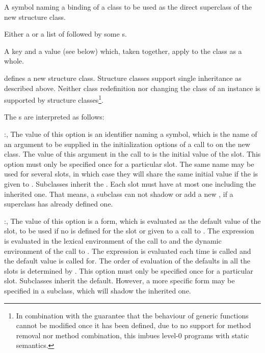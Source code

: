 \begin{optDefinition}
\begin{arguments}
    \item[\scref{superclass-name}] A symbol naming a binding of a class to be
    used as the direct superclass of the new structure class.

    \item[\scref{slot}] Either a  or a list of
     followed by some s.

    \item[\scref{class-option}] A key and a value (see below) which, taken
    together, apply to the class as a whole.
\end{arguments}
%
\remarks%
 defines a new structure class. Structure classes support
single inheritance as described above. Neither class redefinition nor changing
the class of an instance is supported by structure classes\footnote{In
    combination with the guarantee that the behaviour of generic functions
    cannot be modified once it has been defined, due to no support for method
    removal nor method combination, this imbues level-0 programs with static
    semantics.}.

The s are interpreted as follows:
\begin{options}
    \item[\keyworddef{keyword}:, \scref{identifier}]%
    The value of this option is an identifier naming a symbol, which is the name
    of an argument to be supplied in the initialization options of a call to
     on the new class.  The value of this argument in the call
    to  is the initial value of the slot.  This option must
    only be specified once for a particular slot.  The same  name
    may be used for several slots, in which case they will share the same
    initial value if the  is given to .
    Subclasses inherit the . Each slot must have at most one
     including the inherited one. That means, a subclass can not
    shadow or add a new , if a superclass has already defined
    one.

    \item[\keyworddef{default}:, \scref{level-0-form}]%
    The value of this option is a form, which is evaluated as the default
    value of the slot, to be used if no  is defined for the slot
    or given to a call to .  The expression is evaluated in
    the lexical environment of the call to  and the dynamic
    environment of the call to .  The expression is evaluated
    each time  is called and the default value is called for.
    The order of evaluation of the defaults in all the slots is determined by
    .  This option must only be specified once for a
    particular slot. Subclasses inherit the default.  However, a more specific
    form may be specified in a subclass, which will shadow the inherited one.


\end{options}
\end{optDefinition}

